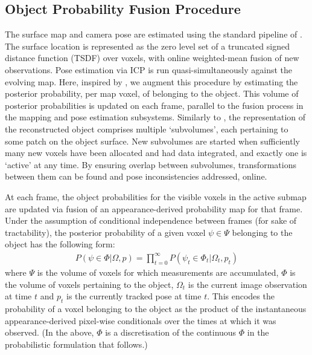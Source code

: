 \subsection{Object Probability Fusion Procedure}
\label{subsec:probfusion}

The surface map and camera pose are estimated using the standard pipeline of \cite{Newcombe2011,Prisacariu2014}. The surface location is represented as the zero level set of a truncated signed distance function (TSDF) over voxels, with online weighted-mean fusion of new observations. Pose estimation via ICP is run quasi-simultaneously against the evolving map. Here, inspired by \cite{Kolev2006}, we augment this procedure by estimating the posterior probability, per map voxel, of belonging to the object. This volume of posterior probabilities is updated on each frame, parallel to the fusion process in the mapping and pose estimation subsystems. Similarly to \cite{Kahler2016}, the representation of the reconstructed object comprises multiple `subvolumes', each pertaining to some patch on the object surface. New subvolumes are started when sufficiently many new voxels have been allocated and had data integrated, and exactly one is `active' at any time. By ensuring overlap between subvolumes, transformations between them can be found and pose inconsistencies addressed, online.

At each frame, the object probabilities for the visible voxels in the active submap are updated via fusion of an appearance-derived probability map for that frame. Under the assumption of conditional independence between frames (for sake of tractability), the posterior probability of a given voxel $\psi \in \Psi$ belonging to the object has the following form:
\begin{equation}
\begin{split}
P(\psi \in \Phi | \Omega, p) = \prod_{t=0}^{\infty} P(\psi_{t} \in \Phi_{t} | \Omega_{t}, p_{t})
\end{split}
\end{equation}
where $\Psi$ is the volume of voxels for which measurements are accumulated, $\Phi$ 
is the volume of voxels pertaining to the object, $\Omega_{t}$ is the current image observation at time $t$ and $p_{t}$ is the 
currently tracked pose at time $t$.
This encodes the probability of a voxel belonging to the object as the product of the instantaneous appearance-derived pixel-wise conditionals over the times at which it was observed.
(In the above,
$\Phi$ is a discretisation of the continuous $\Phi$ in the probabilistic formulation that follows.)

